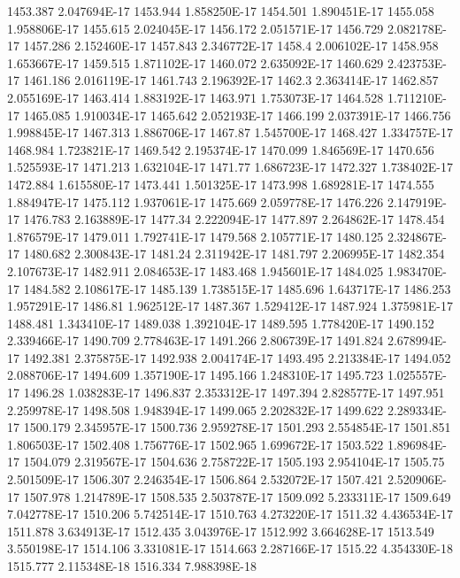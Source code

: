 1453.387  2.047694E-17
1453.944  1.858250E-17
1454.501  1.890451E-17
1455.058  1.958806E-17
1455.615  2.024045E-17
1456.172  2.051571E-17
1456.729  2.082178E-17
1457.286  2.152460E-17
1457.843  2.346772E-17
1458.4  2.006102E-17
1458.958  1.653667E-17
1459.515  1.871102E-17
1460.072  2.635092E-17
1460.629  2.423753E-17
1461.186  2.016119E-17
1461.743  2.196392E-17
1462.3  2.363414E-17
1462.857  2.055169E-17
1463.414  1.883192E-17
1463.971  1.753073E-17
1464.528  1.711210E-17
1465.085  1.910034E-17
1465.642  2.052193E-17
1466.199  2.037391E-17
1466.756  1.998845E-17
1467.313  1.886706E-17
1467.87  1.545700E-17
1468.427  1.334757E-17
1468.984  1.723821E-17
1469.542  2.195374E-17
1470.099  1.846569E-17
1470.656  1.525593E-17
1471.213  1.632104E-17
1471.77  1.686723E-17
1472.327  1.738402E-17
1472.884  1.615580E-17
1473.441  1.501325E-17
1473.998  1.689281E-17
1474.555  1.884947E-17
1475.112  1.937061E-17
1475.669  2.059778E-17
1476.226  2.147919E-17
1476.783  2.163889E-17
1477.34  2.222094E-17
1477.897  2.264862E-17
1478.454  1.876579E-17
1479.011  1.792741E-17
1479.568  2.105771E-17
1480.125  2.324867E-17
1480.682  2.300843E-17
1481.24  2.311942E-17
1481.797  2.206995E-17
1482.354  2.107673E-17
1482.911  2.084653E-17
1483.468  1.945601E-17
1484.025  1.983470E-17
1484.582  2.108617E-17
1485.139  1.738515E-17
1485.696  1.643717E-17
1486.253  1.957291E-17
1486.81  1.962512E-17
1487.367  1.529412E-17
1487.924  1.375981E-17
1488.481  1.343410E-17
1489.038  1.392104E-17
1489.595  1.778420E-17
1490.152  2.339466E-17
1490.709  2.778463E-17
1491.266  2.806739E-17
1491.824  2.678994E-17
1492.381  2.375875E-17
1492.938  2.004174E-17
1493.495  2.213384E-17
1494.052  2.088706E-17
1494.609  1.357190E-17
1495.166  1.248310E-17
1495.723  1.025557E-17
1496.28  1.038283E-17
1496.837  2.353312E-17
1497.394  2.828577E-17
1497.951  2.259978E-17
1498.508  1.948394E-17
1499.065  2.202832E-17
1499.622  2.289334E-17
1500.179  2.345957E-17
1500.736  2.959278E-17
1501.293  2.554854E-17
1501.851  1.806503E-17
1502.408  1.756776E-17
1502.965  1.699672E-17
1503.522  1.896984E-17
1504.079  2.319567E-17
1504.636  2.758722E-17
1505.193  2.954104E-17
1505.75  2.501509E-17
1506.307  2.246354E-17
1506.864  2.532072E-17
1507.421  2.520906E-17
1507.978  1.214789E-17
1508.535  2.503787E-17
1509.092  5.233311E-17
1509.649  7.042778E-17
1510.206  5.742514E-17
1510.763  4.273220E-17
1511.32  4.436534E-17
1511.878  3.634913E-17
1512.435  3.043976E-17
1512.992  3.664628E-17
1513.549  3.550198E-17
1514.106  3.331081E-17
1514.663  2.287166E-17
1515.22  4.354330E-18
1515.777  2.115348E-18
1516.334  7.988398E-18
